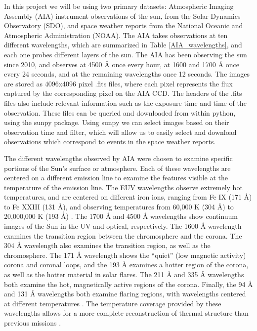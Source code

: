 \documentclass[12pt, letterpaper]{article}
\begin{document}
In this project we will be using two primary datasets: Atmospheric Imaging Assembly (AIA) instrument observations of the sun, from the Solar Dynamics Observatory (SDO), and space weather reports from the National Oceanic and Atmospheric Administration (NOAA).
The AIA takes observations at ten different wavelengths, which are summarized in Table \ref{AIA_wavelengths}, and each one probes different layers of the sun. The AIA has been observing the sun since 2010, and observes at 4500 Å once every hour, at 1600 and 1700 Å once every 24 seconds, and at the remaining wavelengths once 12 seconds. The images are stored as 4096x4096 pixel .fits files, where each pixel represents the flux captured by the corresponding pixel on the AIA CCD. The headers of the .fits files also include relevant information such as the exposure time and time of the observation. These files can be queried and downloaded from within python, using the sunpy package. Using sunpy we can select images based on their observation time and filter, which will allow us to easily select and download observations which correspond to events in the space weather reports. 

The different wavelengths observed by AIA were chosen to examine specific portions of the Sun’s surface or atmosphere. Each of these wavelengths are centered on a different emission line to examine the features visible at the temperature of the emission line. The EUV wavelengths observe extremely hot temperatures, and are centered on different iron ions, ranging from Fe IX (171 Å) to Fe XXIII (131 Å), and observing temperatures from 60,000 K (304 Å) to 20,000,000 K (193 Å) \cite{Lemen2012}. The 1700 Å and 4500 Å wavelengths show continuum images of the Sun in the UV and optical, respectively. The 1600 Å wavelength examines the transition region between the chromosphere and the corona. The 304 Å wavelength also examines the transition region, as well as the chromosphere. The 171 Å wavelength shows the “quiet” (low magnetic activity) corona and coronal loops, and the 193 Å examines a hotter region of the corona, as well as the hotter material in solar flares. The 211 Å and 335 Å wavelengths both examine the hot, magnetically active regions of the corona. Finally, the 94 Å and 131 Å wavelengths both examine flaring regions, with wavelengths centered at different temperatures \cite{Zell2015}. The temperature coverage provided by these wavelengths allows for a more complete reconstruction of thermal structure than previous missions \cite{AIA_ConceptReport}.
\end{document}
